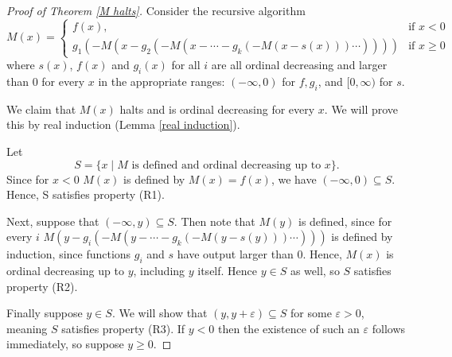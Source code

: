\documentclass{article}
\theoremstyle{definition}
\begin{document}
    \begin{proof}[Proof of Theorem \ref{M halts}]
        Consider the recursive algorithm
        \begin{equation}
        M(x) = 
            \begin{cases}
                f(x), & \text{if  $x < 0$}\\
                g_1(-M(x-g_2(-M(x-\cdots-g_k(-M(x-s(x)))\cdots)))) & \text{if  $x \geq 0$}
            \end{cases}
        \end{equation}
    where $s(x)$, $f(x)$ and $g_i(x)$ for all $i$ are all ordinal decreasing and larger than 0 for every $x$ in the appropriate ranges: $(-\infty, 0)$ for $f,g_i$, and $[0,\infty)$ for $s$.
    
    We claim that $M(x)$ halts and is ordinal decreasing for every $x$. We will prove this by real induction (Lemma \ref{real induction}).

    Let 
    \begin{equation*}
        S=\{x\mid \text{$M$ is defined and ordinal decreasing up to $x$} \}.
    \end{equation*}
Since for $x<0$ $M(x)$ is defined by $M(x)=f(x)$, we have $(-\infty ,0)\subseteq S$. Hence, S satisfies property (R1).

Next, suppose that $(-\infty,y) \subseteq S$. Then note that $M(y)$ is defined, since for every $i$ $M(y-g_i(-M(y-\cdots-g_k(-M(y-s(y)))\cdots)))$ is defined by induction, since functions $g_i$ and $s$ have output larger than $0$. Hence, $M(x)$ is ordinal decreasing up to $y$, including $y$ itself. Hence $y \in S$ as well, so $S$ satisfies property (R2).

Finally suppose $y \in S$. We will show that $(y,y+\varepsilon)\subseteq S$ for some $\varepsilon>0$, meaning $S$ satisfies property (R3). If $y<0$ then the existence of such an $\varepsilon$ follows immediately, so suppose $y\ge 0$.


\end{proof}
\end{document}
